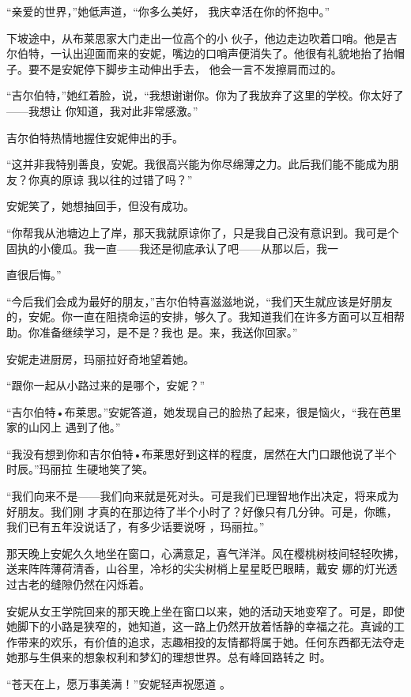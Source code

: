 \documentclass{article}
\begin{document}
“亲爱的世界，”她低声道，“你多么美好，
我庆幸活在你的怀抱中。” 

下坡途中，从布莱思家大门走出一位高个的小
\newpage
伙子，他边走边吹着口哨。他是吉尔伯特，一认出迎面而来的安妮，嘴边的口哨声便消失了。他很有礼貌地抬了抬帽子。要不是安妮停下脚步主动伸出手去，
他会一言不发擦肩而过的。 

“吉尔伯特，”她红着脸，说，“我想谢谢你。你为了我放弃了这里的学校。你太好了——我想让
你知道，我对此非常感激。” 


吉尔伯特热情地握住安妮伸出的手。 

“这并非我特别善良，安妮。我很高兴能为你尽绵薄之力。此后我们能不能成为朋友？你真的原谅
我以往的过错了吗？” 


安妮笑了，她想抽回手，但没有成功。 

“你帮我从池塘边上了岸，那天我就原谅你了，只是我自己没有意识到。我可是个固执的小傻瓜。我一直——我还是彻底承认了吧——从那以后，我一

\newpage
直很后悔。” 

“今后我们会成为最好的朋友，”吉尔伯特喜滋滋地说，“我们天生就应该是好朋友的，安妮。你一直在阻挠命运的安排，够久了。我知道我们在许多方面可以互相帮助。你准备继续学习，是不是？我也
是。来，我送你回家。” 


安妮走进厨房，玛丽拉好奇地望着她。 


“跟你一起从小路过来的是哪个，安妮？” 

“吉尔伯特•布莱思。”安妮答道，她发现自己的脸热了起来，很是恼火，“我在芭里家的山冈上
遇到了他。” 

“我没有想到你和吉尔伯特•布莱思好到这样的程度，居然在大门口跟他说了半个时辰。”玛丽拉
生硬地笑了笑。 

“我们向来不是——我们向来就是死对头。可是我们已理智地作出决定，将来成为好朋友。我们刚
\newpage
才真的在那边待了半个小时了？好像只有几分钟。可是，你瞧，我们已有五年没说话了，有多少话要说呀
，玛丽拉。” 

那天晚上安妮久久地坐在窗口，心满意足，喜气洋洋。风在樱桃树枝间轻轻吹拂，送来阵阵薄荷清香，山谷里，冷杉的尖尖树梢上星星眨巴眼睛，戴安
娜的灯光透过古老的缝隙仍然在闪烁着。 

安妮从女王学院回来的那天晚上坐在窗口以来，她的活动天地变窄了。可是，即使她脚下的小路是狭窄的，她知道，这一路上仍然开放着恬静的幸福之花。真诚的工作带来的欢乐，有价值的追求，志趣相投的友情都将属于她。任何东西都无法夺走她那与生俱来的想象权利和梦幻的理想世界。总有峰回路转之
时。 

“苍天在上，愿万事美满！”安妮轻声祝愿道
。 
\end{document}
